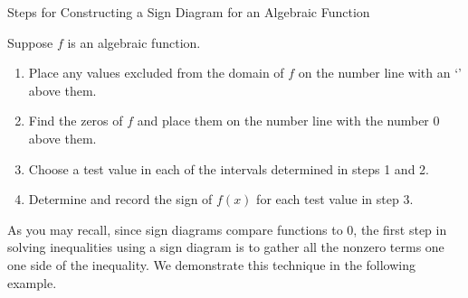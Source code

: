 \begin{ifloatbox}{Steps for Constructing a Sign Diagram for an Algebraic Function}
\label{box:stepsforconstructingsigndiagram}

Suppose $f$ is an algebraic function. 

\begin{enumerate}

\item  Place any values excluded from the domain of  $f$ on the number line with an `\textinterrobang' above them.

\item  Find the zeros of $f$ and place them on the number line with the number $0$ above them.

\item  Choose a test value in each of the intervals determined in steps 1 and 2.

\item  Determine and record the sign of $f(x)$ for each test value in step 3.

\end{enumerate}

\end{ifloatbox}

As you may recall, since sign diagrams compare functions to $0$, the first step in solving inequalities using a sign diagram is to gather all the nonzero terms one one side of the inequality.  We demonstrate this technique in the following example.

